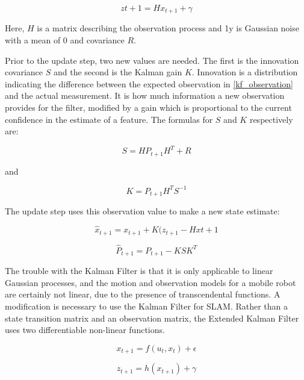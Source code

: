 \documentclass[12pt]{report}
\begin{document}
\begin{equation}\label{kf_observation}
z{t+1} = Hx_{t+1} + \gamma
\end{equation}

Here, $H$ is a matrix describing the observation process and 1y
is Gaussian noise with a mean of 0 and covariance $R$.

Prior to the update step, two new values are needed. The first is the
innovation covariance $S$ and the second is the Kalman gain $K$.
Innovation is a distribution indicating the difference between the
expected observation in \ref{kf_observation} and the actual
measurement. It is how much information a new observation provides for
the filter, modified by a gain which is proportional to the current
confidence in the estimate of a feature.  The formulas for $S$ and $K$
respectively are:

\begin{equation}\label{kf_innovation}
S = HP_{t+1}H^T + R
\end{equation}

and

\begin{equation}\label{kf_gain}
K = P_{t+1}H^TS^{-1}
\end{equation}

The update step uses this observation value to make a new state
estimate:

\begin{equation}\label{kf_update}
\hat{x}_{t+1} = x_{t+1} + K(z_{t+1} - Hx{t+1}
\end{equation}

\begin{equation}\label{kf_update_cov}
\hat{P}_{t+1} = P_{t+1} - KSK^T
\end{equation}


The trouble with the Kalman Filter is that it is only applicable to
linear Gaussian processes, and the motion and observation models for a
mobile robot are certainly not linear, due to the presence of
transcendental functions. A modification is necessary to use the
Kalman Filter for SLAM. Rather than a state transition matrix and an
observation matrix, the Extended Kalman Filter uses two differentiable
non-linear functions.

\begin{equation}\label{ekf_f}
x_{t+1} = f(u_t, x_t) + \epsilon
\end{equation}

\begin{equation}\label{ekf_h}
z_{t+1} = h(x_{t+1}) + \gamma
\end{equation}
\end{document}
